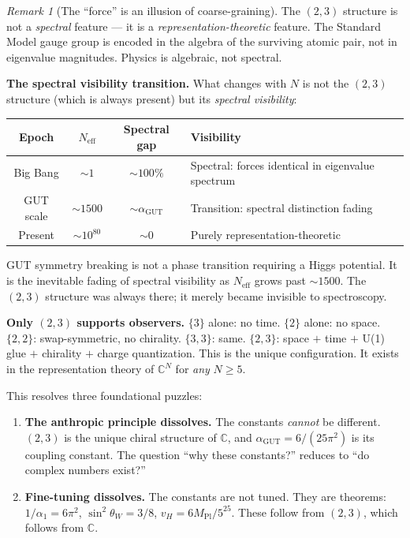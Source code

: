 \documentclass[12pt]{article}
\theoremstyle{remark}
\newtheorem{remark}[theorem]{Remark}
\theoremstyle{definition}
\newcommand{\CC}{\mathbb{C}}
\begin{document}
\begin{remark}[The ``force'' is an illusion of coarse-graining]
The $(2,3)$ structure is not a \emph{spectral} feature --- it is a \emph{representation-theoretic} feature. The Standard Model gauge group is encoded in the algebra of the surviving atomic pair, not in eigenvalue magnitudes. Physics is algebraic, not spectral.

\textbf{The spectral visibility transition.} What changes with $N$ is not the $(2,3)$ structure (which is always present) but its \emph{spectral visibility}:

\begin{center}
\begin{tabular}{cccl}
\hline
Epoch & $N_\text{eff}$ & Spectral gap & Visibility \\
\hline
Big Bang & $\sim 1$ & $\sim 100\%$ & Spectral: forces identical in eigenvalue spectrum \\
GUT scale & $\sim 1500$ & $\sim \alpha_\text{GUT}$ & Transition: spectral distinction fading \\
Present & $\sim 10^{80}$ & $\sim 0$ & Purely representation-theoretic \\
\hline
\end{tabular}
\end{center}

GUT symmetry breaking is not a phase transition requiring a Higgs potential. It is the inevitable fading of spectral visibility as $N_\text{eff}$ grows past $\sim 1500$. The $(2,3)$ structure was always there; it merely became invisible to spectroscopy.

\textbf{Only $(2,3)$ supports observers.} $\{3\}$ alone: no time. $\{2\}$ alone: no space. $\{2,2\}$: swap-symmetric, no chirality. $\{3,3\}$: same. $\{2,3\}$: space $+$ time $+$ U(1) glue $+$ chirality $+$ charge quantization. This is the unique configuration. It exists in the representation theory of $\CC^N$ for \emph{any} $N \geq 5$.

This resolves three foundational puzzles:

\begin{enumerate}
\item \textbf{The anthropic principle dissolves.} The constants \emph{cannot} be different. $(2,3)$ is the unique chiral structure of $\CC$, and $\alpha_\text{GUT} = 6/(25\pi^2)$ is its coupling constant. The question ``why these constants?'' reduces to ``do complex numbers exist?''

\item \textbf{Fine-tuning dissolves.} The constants are not tuned. They are theorems: $1/\alpha_1 = 6\pi^2$, $\sin^2\theta_W = 3/8$, $v_H = 6M_\text{Pl}/5^{25}$. These follow from $(2,3)$, which follows from $\CC$.


\end{enumerate}
\end{remark}
\end{document}
